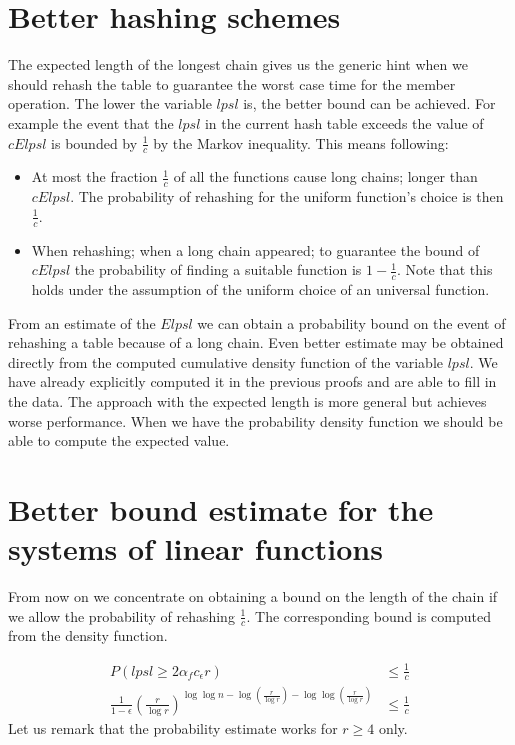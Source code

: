 \section{Better hashing schemes}
The expected length of the longest chain gives us the generic hint when we should rehash the table to guarantee the worst case time for the member operation. The lower the variable $lpsl$ is, the better bound can be achieved. For example the event that the $lpsl$ in the current hash table exceeds the value of $c E lpsl$ is bounded by $\frac{1}{c}$ by the Markov inequality. This means following:
\begin{itemize}
\item At most the fraction $\frac{1}{c}$ of all the functions cause long chains; longer than $c E lpsl$. The probability of rehashing for the uniform function's choice is then $\frac{1}{c}$.
\item When rehashing; when a long chain appeared; to guarantee the bound of $c E lpsl$ the probability of finding a suitable function is $1 - \frac{1}{c}$. Note that this holds under the assumption of the uniform choice of an universal function.
\end{itemize}

From an estimate of the $E lpsl$ we can obtain a probability bound on the event of rehashing a table because of a long chain. Even better estimate may be obtained directly from the computed cumulative density function of the variable $lpsl$. We have already explicitly computed it in the previous proofs and are able to fill in the data. The approach with the expected length is more general but achieves worse performance. When we have the probability density function we should be able to compute the expected value. 

\section{Better bound estimate for the systems of linear functions}
\label{section-linear-systems-linear-amount-constant-estimate}
From now on we concentrate on obtaining a bound on the length of the chain if we allow the probability of rehashing $\frac{1}{c}$. The corresponding bound is computed from the density function.

\begin{displaymath}
\begin{split}
P(lpsl \geq 2\alpha_f c_\epsilon r) & \leq \frac{1}{c} \\ 
\frac{1}{1 - \epsilon}\left(\frac{r}{\log r}\right)^{\log \log n - \log \left(\frac{r}{\log r}\right) - \log \log \left(\frac{r}{\log r}\right)} & \leq \frac{1}{c}
\end{split}
\end{displaymath}
Let us remark that the probability estimate works for $r \geq 4$ only.

